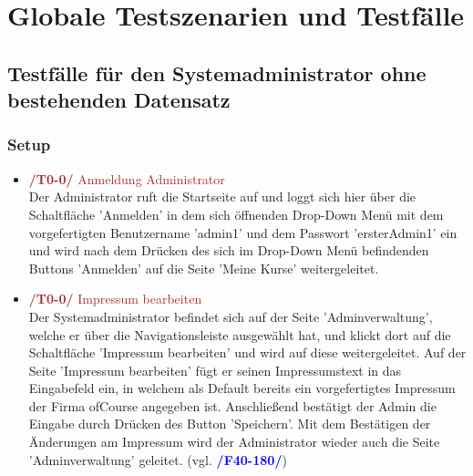 \documentclass[a4paper]{scrreprt}
\newcounter{Lc}
\newcounter{Hc}
\newcommand{\resetAllCounter}{\setcounter{Lc}{0}\setcounter{Hc}{1}}
\begin{document}
\resetAllCounter
\newcommand{\Test}[1]{\stepcounter{Lc}\textcolor{Brown}{\textbf{/T\arabic{Hc}0-\arabic{Lc}0/} #1} \\}
\newcommand{\RefFuncBlue}[1]{\textcolor{Blue}{\textbf{#1}}}
\newcommand{\RefFuncGreen}[1]{\textcolor{Green}{\textbf{#1}}}
\newcommand{\RefFuncBrown}[1]{\textcolor{Brown}{\textbf{#1}}}
\chapter{Globale Testszenarien und Testfälle}
 

	\section{Testfälle für den Systemadministrator ohne bestehenden Datensatz}
		\subsection{Setup}
			\begin{itemize}
				\item \Test{Anmeldung Administrator} 
			     Der Administrator ruft die Startseite auf und loggt sich hier über die Schaltfläche 'Anmelden' in dem sich öffnenden Drop-Down Menü mit dem vorgefertigten Benutzername 'admin1' und dem Passwort 'ersterAdmin1' ein und wird nach dem Drücken des sich im Drop-Down Menü befindenden Buttons 'Anmelden' auf die Seite 'Meine Kurse' weitergeleitet. 
				 
				\item \Test{Impressum bearbeiten}
				 Der Systemadministrator befindet sich auf der Seite 'Adminverwaltung', welche er über die Navigationsleiste ausgewählt hat, und klickt dort auf die Schaltfläche 'Impressum bearbeiten' und wird auf diese weitergeleitet. Auf der Seite 'Impressum bearbeiten' fügt er seinen Impressumstext in das Eingabefeld ein, in welchem als Default bereits ein vorgefertigtes Impressum der Firma ofCourse angegeben ist. Anschließend bestätigt der Admin die Eingabe durch Drücken des Button 'Speichern'. Mit dem Bestätigen der Änderungen am Impressum wird der Administrator wieder auch die Seite 'Adminverwaltung' geleitet. (vgl. \RefFuncBlue{/F40-180/})
				 
				
			\end{itemize}		
				
\end{document}
